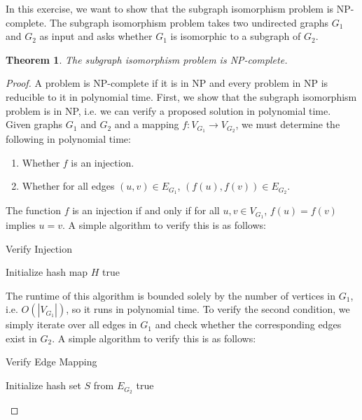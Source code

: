 \documentclass{article}
\newtheorem{theorem}{Theorem}
\begin{document}
\noindent In this exercise, we want to show that the subgraph isomorphism problem is NP-complete.
The subgraph isomorphism problem takes two undirected graphs $G_1$ and $G_2$ as input and asks whether $G_1$ is isomorphic to a subgraph of $G_2$.

\begin{theorem}
The subgraph isomorphism problem is NP-complete.
\end{theorem}

\begin{proof}
    A problem is NP-complete if it is in NP and every problem in NP is reducible to it in polynomial time.
    First, we show that the subgraph isomorphism problem is in NP, i.e. we can verify a proposed solution in polynomial time.
    Given graphs $G_1$ and $G_2$ and a mapping $f: V_{G_1} \to V_{G_2}$, we must determine the following in polynomial time:
    \begin{enumerate}
        \item Whether $f$ is an injection.
        \item Whether for all edges $(u, v) \in E_{G_1}$, $(f(u), f(v)) \in E_{G_2}$.
    \end{enumerate}
    The function $f$ is an injection if and only if for all $u, v \in V_{G_1}$, $f(u) = f(v)$ implies $u = v$.
    A simple algorithm to verify this is as follows:

    \begin{algorithm}[H]
        \caption{Verify Injection}
        Initialize hash map $H$\;
        \Return true\;
    \end{algorithm}

    The runtime of this algorithm is bounded solely by the number of vertices in $G_1$, i.e. $O(|V_{G_1}|)$, so it runs in polynomial time.
    To verify the second condition, we simply iterate over all edges in $G_1$ and check whether the corresponding edges exist in $G_2$.
    A simple algorithm to verify this is as follows:

    \begin{algorithm}[H]
        \caption{Verify Edge Mapping}
        Initialize hash set $S$ from $E_{G_2}$\;
        \Return true\;
    \end{algorithm}


\end{proof}
\end{document}
